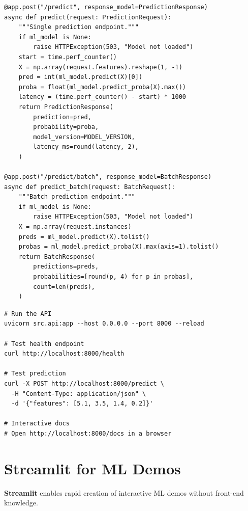 \begin{codeblock}[title=\textbf{Complete FastAPI ML serving application}]
\begin{verbatim}
@app.post("/predict", response_model=PredictionResponse)
async def predict(request: PredictionRequest):
    """Single prediction endpoint."""
    if ml_model is None:
        raise HTTPException(503, "Model not loaded")
    start = time.perf_counter()
    X = np.array(request.features).reshape(1, -1)
    pred = int(ml_model.predict(X)[0])
    proba = float(ml_model.predict_proba(X).max())
    latency = (time.perf_counter() - start) * 1000
    return PredictionResponse(
        prediction=pred,
        probability=proba,
        model_version=MODEL_VERSION,
        latency_ms=round(latency, 2),
    )

@app.post("/predict/batch", response_model=BatchResponse)
async def predict_batch(request: BatchRequest):
    """Batch prediction endpoint."""
    if ml_model is None:
        raise HTTPException(503, "Model not loaded")
    X = np.array(request.instances)
    preds = ml_model.predict(X).tolist()
    probas = ml_model.predict_proba(X).max(axis=1).tolist()
    return BatchResponse(
        predictions=preds,
        probabilities=[round(p, 4) for p in probas],
        count=len(preds),
    )
\end{verbatim}
\end{codeblock}

\begin{codeblock}[title=\textbf{Running and testing the API}]
\begin{verbatim}
# Run the API
uvicorn src.api:app --host 0.0.0.0 --port 8000 --reload

# Test health endpoint
curl http://localhost:8000/health

# Test prediction
curl -X POST http://localhost:8000/predict \
  -H "Content-Type: application/json" \
  -d '{"features": [5.1, 3.5, 1.4, 0.2]}'

# Interactive docs
# Open http://localhost:8000/docs in a browser
\end{verbatim}
\end{codeblock}

\section{Streamlit for ML Demos}
\label{sec:streamlit}

\textbf{Streamlit} enables rapid creation of
interactive ML demos without front-end knowledge.

